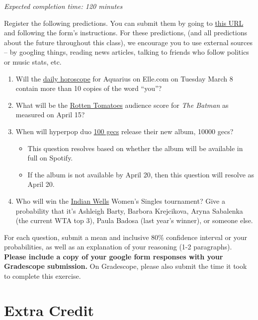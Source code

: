 \documentclass[11pt]{article}
\begin{document}
\emph{Expected completion time: 120 minutes}

Register the following predictions. You can submit them by going to \href{https://docs.google.com/forms/d/e/1FAIpQLSfGARO8mpj0GiFtOKuuVa9eBnkq6g2dTJU53qfqTmhQLDaZFg/viewform?usp=sf_link}{this URL} and following the form's instructions. For these predictions, (and all predictions about the future throughout this class), we encourage you to use external sources -- by googling things, reading news articles, talking to friends who follow politics or music stats, etc.

\begin{enumerate}
	\item Will the \href{https://www.elle.com/horoscopes/daily/a107/aquarius-daily-horoscope/}{daily horoscope} for Aquarius on Elle.com on Tuesday March 8 contain more than 10 copies of the word ``you''?
	\item What will be the \href{https://www.rottentomatoes.com/m/the_batman}{Rotten Tomatoes} audience score for \emph{The Batman} as measured on April 15?
	\item When will hyperpop duo \href{https://en.wikipedia.org/wiki/100_Gecs}{100 gecs} release their new album, 10000 gecs?
	\begin{itemize}
		\item This question resolves based on whether the album will be available in full on Spotify.
		\item If the album is not available by April 20, then this question will resolve as April 20.
	\end{itemize}
	\item Who will win the \href{https://bnpparibasopen.com/players/current/?assoc=wta&type=singles}{Indian Wells} Women's Singles tournament? Give a probability that it's Ashleigh Barty, Barbora Krejcikova, Aryna Sabalenka (the current WTA top 3), Paula Badosa (last year's winner), or someone else.
\end{enumerate}

For each question, submit a mean and inclusive 80\% confidence interval or your probabilities, as well as an explanation of your reasoning (1-2 paragraphs). \textbf{Please include a copy of your google form responses with your Gradescope submission.} On Gradescope, please also submit the time it took to complete this exercise.

\section*{Extra Credit}
\end{document}
